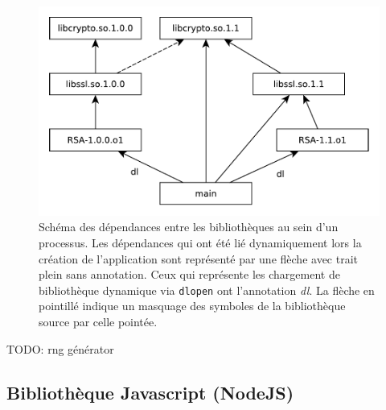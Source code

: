 \begin{center}
\begin{figure}[ht]
\includegraphics{figures/libssl_masking.pdf}
\caption{Schéma des dépendances entre les bibliothèques au sein d'un processus.
Les dépendances qui ont été lié dynamiquement lors la création de l'application sont représenté par une flèche avec
trait plein sans annotation. Ceux qui représente les chargement de bibliothèque dynamique via \texttt{dlopen} ont
l'annotation \textit{dl}. La flèche en pointillé indique un masquage des symboles de la bibliothèque
source par celle pointée.}
\label{fig:scm_masq_schema}
\end{figure}
\end{center}

TODO: rng générator










\subsection{Bibliothèque Javascript (NodeJS)}

